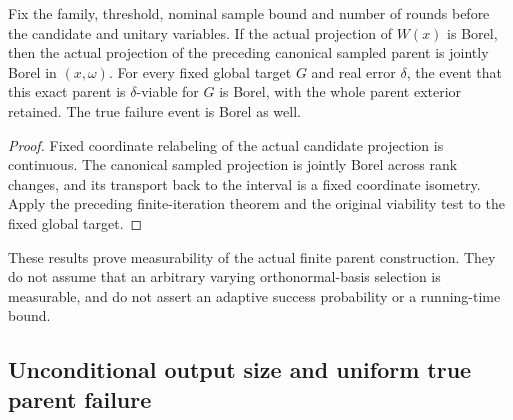 \begin{lemma}
    \label{lem:borel_canonical_sampled_interval_interleaved_parent}
    \leanok
    Fix the family, threshold, nominal sample bound and number of rounds
    before the candidate and unitary variables. If the actual projection
    of $W(x)$ is Borel, then the actual projection of the preceding
    canonical sampled parent is jointly Borel in $(x,\omega)$. For every
    fixed global target $G$ and real error $\delta$, the event that this
    exact parent is $\delta$-viable for $G$ is Borel, with the whole parent
    exterior retained. The true failure event is Borel as well.
\end{lemma}
\begin{proof}\leanok
    Fixed coordinate relabeling of the actual candidate projection is
    continuous. The canonical sampled projection is jointly Borel across
    rank changes, and its transport back to the interval is a fixed
    coordinate isometry. Apply the preceding finite-iteration theorem
    and the original viability test to the fixed global target.
\end{proof}

These results prove measurability of the actual finite parent construction.
They do not assume that an arbitrary varying orthonormal-basis selection
is measurable, and do not assert an adaptive success probability or a
running-time bound.

\subsection{Unconditional output size and uniform true parent failure}

